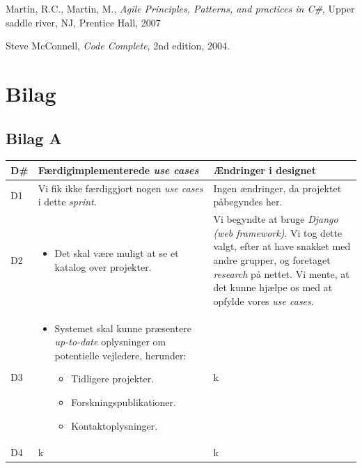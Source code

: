 \documentclass[12pt]{article}
\begin{document}
\begin{thebibliography}{9}

	Martin, R.C., Martin, M.,
	\emph{Agile Principles, Patterns, and practices in C\#},
	Upper saddle river, NJ, Prentice Hall,
	2007

	Steve McConnell,
	\emph{Code Complete},
	2nd edition,
	2004.

\end{thebibliography}


\section{Bilag}
\label{sec:bilag}

\subsection{Bilag A}
\label{sec:bilagA}
\begin{center}
	\begin{tabular}{|p{}|p{}|p{}|}
		\hline
	\textbf{D\#} & \textbf{Færdigimplementerede \textit{use cases}} & \textbf{Ændringer i designet} \\ \hline

	D1 & Vi fik ikke færdiggjort nogen \textit{use cases} i dette \textit{sprint}. & Ingen ændringer, da projektet påbegyndes her. \\ \hline

	D2 & 		\begin{minipage}[t]{0.4\textwidth}
	\begin{itemize}
		\item Det skal være muligt at se et katalog over projekter.
		\end{itemize}
		\end{minipage} & Vi begyndte at bruge \textit{Django (web framework)}. Vi tog dette valgt, efter at have snakket med andre grupper, og foretaget \textit{research} på nettet. Vi mente, at det kunne hjælpe os med at opfylde vores \textit{use cases}. \\ \hline

	D3 &
	\begin{minipage}[t]{0.4\textwidth}
	\begin{itemize}
		\item Systemet skal kunne præsentere \textit{up-to-date} oplysninger om potentielle vejledere, herunder:
		\begin{itemize}
			\item Tidligere projekter.
			\item Forskningspublikationer.
			\item Kontaktoplysninger.
		\end{itemize}
	\end{itemize}
	\end{minipage} & k \\
		\hline
	D4 & k & k \\ \hline
	\end{tabular}
\end{center}
\end{document}
